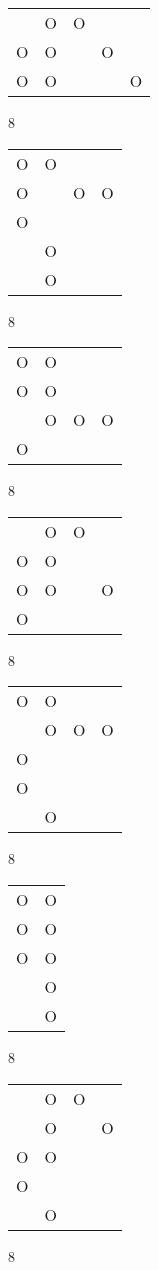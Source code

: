 \begin{tabular}{|m{0.2cm}m{0.2cm}m{0.2cm}m{0.2cm}m{0.2cm}|}\hline
 &O&O& & \\
O&O& &O& \\
O&O& & &O\\
\hline\end{tabular}8
\begin{tabular}{|m{0.2cm}m{0.2cm}m{0.2cm}m{0.2cm}|}\hline
O&O& & \\
O& &O&O\\
O& & & \\
 &O& & \\
 &O& & \\
\hline\end{tabular}8
\begin{tabular}{|m{0.2cm}m{0.2cm}m{0.2cm}m{0.2cm}|}\hline
O&O& & \\
O&O& & \\
 &O&O&O\\
O& & & \\
\hline\end{tabular}8
\begin{tabular}{|m{0.2cm}m{0.2cm}m{0.2cm}m{0.2cm}|}\hline
 &O&O& \\
O&O& & \\
O&O& &O\\
O& & & \\
\hline\end{tabular}8
\begin{tabular}{|m{0.2cm}m{0.2cm}m{0.2cm}m{0.2cm}|}\hline
O&O& & \\
 &O&O&O\\
O& & & \\
O& & & \\
 &O& & \\
\hline\end{tabular}8
\begin{tabular}{|m{0.2cm}m{0.2cm}|}\hline
O&O\\
O&O\\
O&O\\
 &O\\
 &O\\
\hline\end{tabular}8
\begin{tabular}{|m{0.2cm}m{0.2cm}m{0.2cm}m{0.2cm}|}\hline
 &O&O& \\
 &O& &O\\
O&O& & \\
O& & & \\
 &O& & \\
\hline\end{tabular}8
